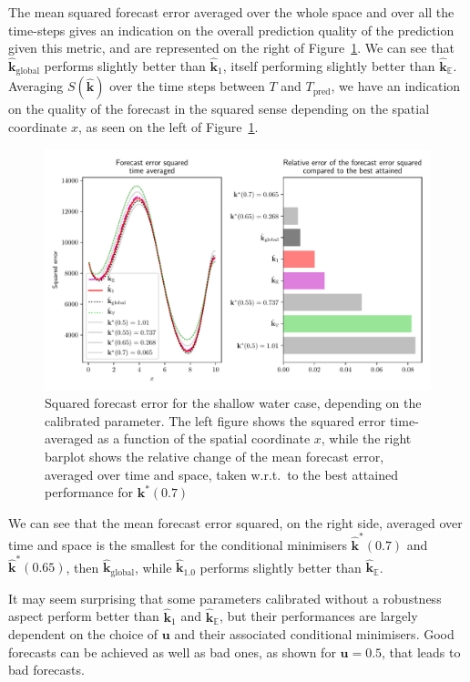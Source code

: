 \documentclass[preprint, review, 1p]{elsarticle}
\newcommand{\Ex}{\mathbb{E}}
\newcommand{\hatkmean}{\hat{\mathbf{k}}_{\Ex}}
\newcommand{\kest}{\hat{\mathbf{k}}}
\newlength{\onehalfcolumn}
\begin{document}
The mean squared forecast error averaged over the whole space and over all the time-steps gives an indication on the overall prediction quality of the prediction given this metric, and are represented on the right of Figure~\ref{fig:forecast_squared_error}. We can see that $\kest_{\mathrm{global}}$ performs slightly better than $\kest_1$, itself performing slightly better than $\hatkmean$.
Averaging $S(\mathbf{\kest})$ over the time steps between $T$ and $T_{\mathrm{pred}}$, we have an indication on the quality of the forecast in the squared sense depending on the spatial coordinate $x$, as seen on the left of Figure~\ref{fig:forecast_squared_error}.

\begin{figure}[!h]
\centering
\includegraphics[width=\onehalfcolumn]{Figures/FIG13.pdf}
\caption{Squared forecast error for the shallow water case, depending on the calibrated parameter. The left figure shows the squared error time-averaged as a function of the spatial coordinate $x$, while the right barplot shows the relative change of the mean forecast error, averaged over time and space, taken w.r.t.\ to the best attained performance for $\mathbf{k}^*(0.7)$}
\label{fig:forecast_squared_error}
\end{figure}

We can see that the mean forecast error squared, on the right side, averaged over time and space is the smallest for the conditional minimisers $\kest^*(0.7)$ and $\kest^*(0.65)$, then $\kest_{\mathrm{global}}$, while $\kest_{1.0}$ performs slightly better than $\hatkmean$.


It may seem surprising that some parameters calibrated without a robustness aspect perform better than $\kest_1$ and $\hatkmean$, but their performances are largely dependent on the choice of $\mathbf{u}$ and their associated conditional minimisers. Good forecasts can be achieved as well as bad ones, as shown for $\mathbf{u}=0.5$, that leads to bad forecasts.
\end{document}
